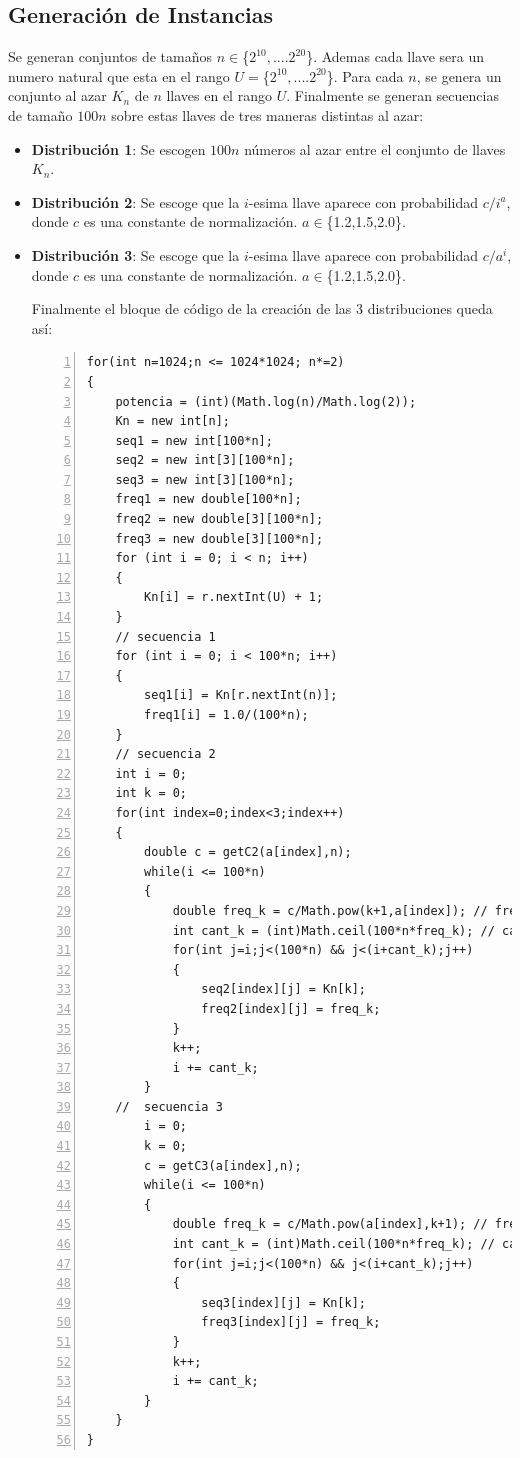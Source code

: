 \documentclass[letterpaper,12pt]{article}
\begin{document}
\subsection{Generaci\'on de Instancias}

Se generan conjuntos de tamaños $ n \in$\{$2^{10},....2^{20}$\}. Ademas cada llave sera un numero natural que esta en el rango $ U = $\{$2^{10},....2^{20}$\}. Para cada $n$, se genera un conjunto al azar $K_n$ de $n$ llaves en el rango $U$. Finalmente se generan secuencias de tamaño $100n$ sobre estas llaves de tres maneras distintas al azar:
\begin{itemize}

\item \textbf{Distribución 1}: Se escogen $100n$ números al azar entre el conjunto de llaves $K_n$.

\item \textbf{Distribución 2}: Se escoge que la $i$-esima llave aparece con probabilidad $c/i^a$, donde $c$ es una constante de normalización. $ a \in$\{1.2,1.5,2.0\}.

\item \textbf{Distribución 3}: Se escoge que la $i$-esima llave aparece con probabilidad $c/a^i$, donde $c$ es una constante de normalización. $ a \in$\{1.2,1.5,2.0\}.

Finalmente el bloque de código de la creación de las 3 distribuciones queda así:

\lstset{language=Java, breaklines=true, basicstyle=\footnotesize}
\begin{lstlisting}[frame=single, numbersep=5pt, numbers=left, tabsize=3] 
for(int n=1024;n <= 1024*1024; n*=2)
{
	potencia = (int)(Math.log(n)/Math.log(2));
	Kn = new int[n];
	seq1 = new int[100*n];
	seq2 = new int[3][100*n];
	seq3 = new int[3][100*n];
	freq1 = new double[100*n];
	freq2 = new double[3][100*n];
	freq3 = new double[3][100*n];
	for (int i = 0; i < n; i++) 
	{
		Kn[i] = r.nextInt(U) + 1;
	}
	// secuencia 1
	for (int i = 0; i < 100*n; i++) 
	{
		seq1[i] = Kn[r.nextInt(n)];
		freq1[i] = 1.0/(100*n);
	}
	// secuencia 2 
	int i = 0;
	int k = 0;
	for(int index=0;index<3;index++)
	{
		double c = getC2(a[index],n);
		while(i <= 100*n)
		{				
			double freq_k = c/Math.pow(k+1,a[index]); // frecuencia de Kn[k]
			int cant_k = (int)Math.ceil(100*n*freq_k); // cantidad de Kn[k]
			for(int j=i;j<(100*n) && j<(i+cant_k);j++)
			{
				seq2[index][j] = Kn[k];
				freq2[index][j] = freq_k;
			}
			k++;
			i += cant_k;
		}			
	// 	secuencia 3 
		i = 0;
		k = 0;
		c = getC3(a[index],n);
		while(i <= 100*n)
		{
			double freq_k = c/Math.pow(a[index],k+1); // frecuencia de Kn[k]
			int cant_k = (int)Math.ceil(100*n*freq_k); // cantidad de Kn[k]
			for(int j=i;j<(100*n) && j<(i+cant_k);j++)
			{
				seq3[index][j] = Kn[k];
				freq3[index][j] = freq_k;
			}
			k++;
			i += cant_k;
		}
	}
}	
\end{lstlisting}

\end{itemize}
\end{document}
